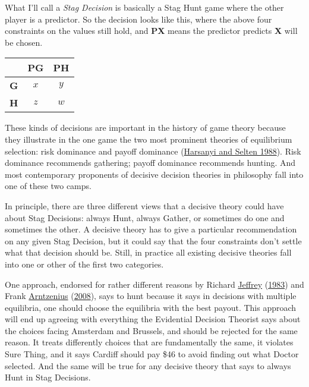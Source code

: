 \documentclass[
  12pt,
]{article}
\begin{document}
What I'll call a \emph{Stag Decision} is basically a Stag Hunt game
where the other player is a predictor. So the decision looks like this,
where the above four constraints on the values still hold, and
\textbf{PX} means the predictor predicts \textbf{X} will be chosen.

\begin{table}[H]
\centering
\begin{tabular}[t]{>{}r|cc}

\textbf{ } & \textbf{PG} & \textbf{PH}\\
\midrule
\textbf{G} & $x$ & $y$\\
\textbf{H} & $z$ & $w$\\

\end{tabular}
\end{table}

These kinds of decisions are important in the history of game theory
because they illustrate in the one game the two most prominent theories
of equilibrium selection: risk dominance and payoff dominance
(\protect\hyperlink{ref-HarsanyiSelten1988}{Harsanyi and Selten 1988}).
Risk dominance recommends gathering; payoff dominance recommends
hunting. And most contemporary proponents of decisive decision theories
in philosophy fall into one of these two camps.

In principle, there are three different views that a decisive theory
could have about Stag Decisions: always Hunt, always Gather, or
sometimes do one and sometimes the other. A decisive theory has to give
a particular recommendation on any given Stag Decision, but it could say
that the four constraints don't settle what that decision should be.
Still, in practice all existing decisive theories fall into one or other
of the first two categories.

One approach, endorsed for rather different reasons by Richard
\protect\hyperlink{ref-Jeffrey1983}{Jeffrey}
(\protect\hyperlink{ref-Jeffrey1983}{1983}) and Frank
\protect\hyperlink{ref-Arntzenius2008}{Arntzenius}
(\protect\hyperlink{ref-Arntzenius2008}{2008}), says to hunt because it
says in decisions with multiple equilibria, one should choose the
equilibria with the best payout. This approach will end up agreeing with
everything the Evidential Decision Theorist says about the choices
facing Amsterdam and Brussels, and should be rejected for the same
reason. It treats differently choices that are fundamentally the same,
it violates Sure Thing, and it says Cardiff should pay \$46 to avoid
finding out what Doctor selected. And the same will be true for any
decisive theory that says to always Hunt in Stag Decisions.
\end{document}
